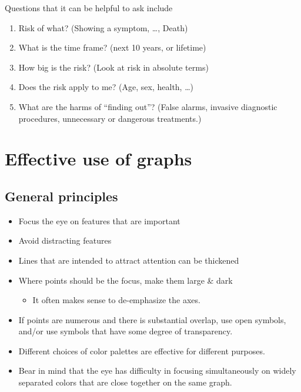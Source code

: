 \documentclass[
  10pt,
  b5paper]{book}
\providecommand{\tightlist}{%
  \setlength{\itemsep}{0pt}\setlength{\parskip}{0pt}}
\begin{document}
Questions that it can be helpful to ask include

\begin{enumerate}
\def\labelenumi{\arabic{enumi}.}
\tightlist
\item
  Risk of what? (Showing a symptom, \ldots, Death)
\item
  What is the time frame? (next 10 years, or lifetime)
\item
  How big is the risk? (Look at risk in absolute terms)
\item
  Does the risk apply to me? (Age, sex, health, \ldots)
\item
  What are the harms of ``finding out''? (False alarms, invasive diagnostic procedures, unnecessary or dangerous treatments.)
\end{enumerate}

\hypertarget{effective-use-of-graphs}{%
\chapter{Effective use of graphs}\label{effective-use-of-graphs}}

\hypertarget{general-principles}{%
\section{General principles}\label{general-principles}}

\begin{itemize}
\tightlist
\item
  Focus the eye on features that are important
\item
  Avoid distracting features
\item
  Lines that are intended to attract attention can be
  thickened
\item
  Where points should be the focus, make them large \& dark

  \begin{itemize}
  \tightlist
  \item
    It often makes sense to de-emphasize the axes.
  \end{itemize}
\item
  If points are numerous and there is substantial overlap,
  use open symbols, and/or use symbols that have some
  degree of transparency.
\item
  Different choices of color palettes are effective for different purposes.
\item
  Bear in mind that the eye has difficulty in focusing
  simultaneously on widely separated colors that are close
  together on the same graph.
\end{itemize}
\end{document}
